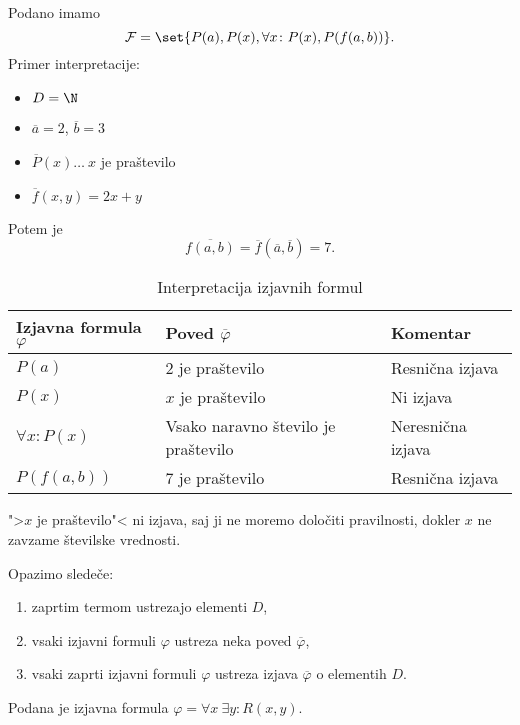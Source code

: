 \documentclass[12pt, a4paper]{article}
\begin{document}
\begin{zgled}
Podano imamo
\[
\mathcal{F}=\set{P(a),P(x),\forall x\colon P(x),P(f(a,b))}.
\]
Primer interpretacije:

\begin{itemize}
\item $D=\N$
\item $\overline{a}=2$, $\overline{b}=3$
\item $\overline{P}(x)\dots~x$ je praštevilo
\item $\overline{f}(x,y)=2x+y$
\end{itemize}

Potem je
\[
\overline{f(a,b)}=\overline{f}(\overline{a},\overline{b})=7.
\]

\begin{table}[H]
\centering
\begin{tabular}{l|l|l}
Izjavna formula $\varphi$ & Poved $\overline{\varphi}$ & Komentar \\
\hline 
$P(a)$                 & 2 je praštevilo                     & Resnična izjava \\
$P(x)$                 & $x$ je praštevilo                   & Ni izjava \\
$\forall x\colon P(x)$ & Vsako naravno število je praštevilo & Neresnična izjava \\
$P(f(a,b))$            & 7 je praštevilo                     & Resnična izjava \\
\end{tabular}
\caption{Interpretacija izjavnih formul}
\end{table}

">$x$ je praštevilo"< ni izjava, saj ji ne moremo določiti pravilnosti, dokler $x$ ne zavzame številske vrednosti.

Opazimo sledeče:

\begin{enumerate}
\item zaprtim termom ustrezajo elementi $D$,
\item vsaki izjavni formuli $\varphi$ ustreza neka poved $\overline{\varphi}$,
\item vsaki zaprti izjavni formuli $\varphi$ ustreza izjava $\overline{\varphi}$ o elementih $D$.
\end{enumerate}
\end{zgled}

\begin{zgled}\label{zg:4}
Podana je izjavna formula $\varphi=\forall x~\exists y\colon R(x,y)$.
\end{zgled}
\end{document}
